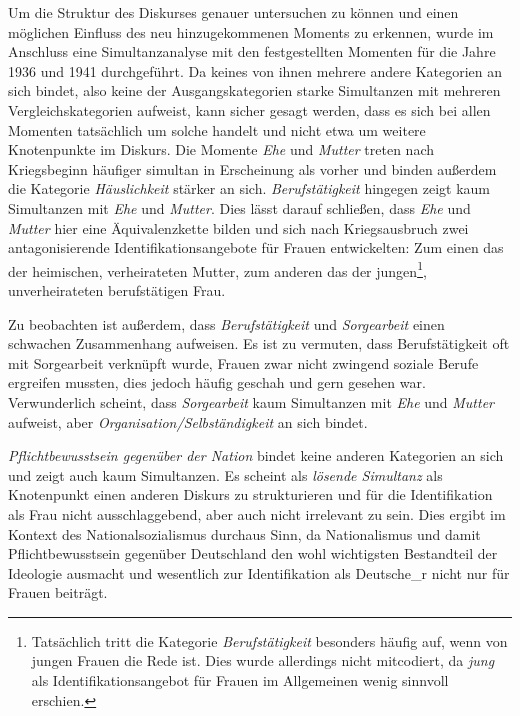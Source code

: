 \documentclass[12pt, titlepage=true, toc=bib]{scrartcl}
\begin{document}
Um die Struktur des Diskurses genauer untersuchen zu können und einen möglichen Einfluss des neu hinzugekommenen Moments zu erkennen, wurde im Anschluss eine Simultanzanalyse mit den festgestellten Momenten für die Jahre 1936 und 1941 durchgeführt. Da keines von ihnen mehrere andere Kategorien an sich bindet, also keine der Ausgangskategorien starke Simultanzen mit mehreren Vergleichskategorien aufweist, kann sicher gesagt werden, dass es sich bei allen Momenten tatsächlich um solche handelt und nicht etwa um weitere Knotenpunkte im Diskurs. Die Momente \textit{Ehe} und \textit{Mutter} treten nach Kriegsbeginn häufiger simultan in Erscheinung als vorher und binden außerdem die Kategorie \textit{Häuslichkeit} stärker an sich. \textit{Berufstätigkeit} hingegen zeigt kaum Simultanzen mit \textit{Ehe} und \textit{Mutter}. Dies lässt darauf schließen, dass \textit{Ehe} und \textit{Mutter} hier eine Äquivalenzkette bilden und sich nach Kriegsausbruch zwei antagonisierende Identifikationsangebote für Frauen entwickelten: Zum einen das der heimischen, verheirateten Mutter, zum anderen das der jungen\footnote{Tatsächlich tritt die Kategorie \textit{Berufstätigkeit} besonders häufig auf, wenn von jungen Frauen die Rede ist. Dies wurde allerdings nicht mitcodiert, da \textit{jung} als Identifikationsangebot für Frauen im Allgemeinen wenig sinnvoll erschien.}, unverheirateten berufstätigen Frau. 


Zu beobachten ist außerdem, dass \textit{Berufstätigkeit} und \textit{Sorgearbeit} einen schwachen Zusammenhang aufweisen. Es ist zu vermuten, dass Berufstätigkeit oft mit Sorgearbeit verknüpft wurde, Frauen zwar nicht zwingend soziale Berufe ergreifen mussten, dies jedoch häufig geschah und gern gesehen war. Verwunderlich scheint, dass \textit{Sorgearbeit} kaum Simultanzen mit \textit{Ehe} und \textit{Mutter} aufweist, aber \textit{Organisation/Selbständigkeit} an sich bindet. 

\textit{Pflichtbewusstsein gegenüber der Nation} bindet keine anderen Kategorien an sich und zeigt auch kaum Simultanzen. Es scheint als \textit{lösende Simultanz} als Knotenpunkt einen anderen Diskurs zu strukturieren und für die Identifikation als Frau nicht ausschlaggebend, aber auch nicht irrelevant zu sein. Dies ergibt im Kontext des Nationalsozialismus durchaus Sinn, da Nationalismus und damit Pflichtbewusstsein gegenüber Deutschland den wohl wichtigsten Bestandteil der Ideologie ausmacht und wesentlich zur Identifikation als Deutsche\_r nicht nur für Frauen beiträgt.
\end{document}
